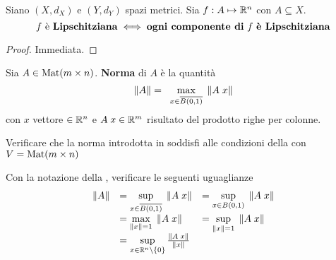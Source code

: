 \begin{proposition}
	Siano $(X,d_X)$ e $(Y,d_Y)$ spazi metrici. Sia $f:A \mapsto \mathbb{R}^n$ con $A \subseteq X$.\\
	\begin{equation*}
		f \text{ è \textbf{Lipschitziana}} \iff \text{\textbf{ogni componente di} } f \text{ \textbf{è Lipschitziana}}
	\end{equation*}
	\begin{proof}
		Immediata.
	\end{proof}
\end{proposition}

\begin{definition}
	\label{def:norm_matr}
	Sia $A \in \operatorname{Mat} (m \times n)$. \textbf{Norma} di $A$ è la quantità
	\[\norm{A} = \;\; \max\limits_{\raisebox{-1ex}{${\scriptstyle x \in \overline{B(0,1)} }$}} \; \norm{A \; x}\]
	con $x$ vettore $\in \mathbb{R}^n$ e $A \; x \in \mathbb{R}^m$ risultato del prodotto righe per colonne.
\end{definition}
\begin{exercise}
	Verificare che la norma introdotta in  soddisfi alle condizioni della  con $V = \operatorname{Mat} (m \times n)$
\end{exercise}
\begin{exercise}
	\label{ex:matr_form_alt}
	Con la notazione della , verificare le seguenti uguaglianze
	{
	\renewcommand*{\arraystretch}{1.5} %
	\begin{equation*}
		\begin{array}{rll}
			\norm{A}	& =\sup\limits_{\raisebox{-1ex}{${\scriptstyle x \in \overline{B(0,1)} }$}} \; \norm{A \; x}	& =\sup\limits_{x \in B(0,1)} \; \norm{A \; x}\\
						& =\max\limits_{\norm{x} = 1} \; \norm{A \; x}													& =\sup\limits_{\norm{x} = 1} \; \norm{A \; x}\\
						& =\sup\limits_{x \in \R^n \setminus \brackets{0}} \frac{\norm{A \; x}}{\norm{x}}
		\end{array}
	\end{equation*}
	}
\end{exercise}

